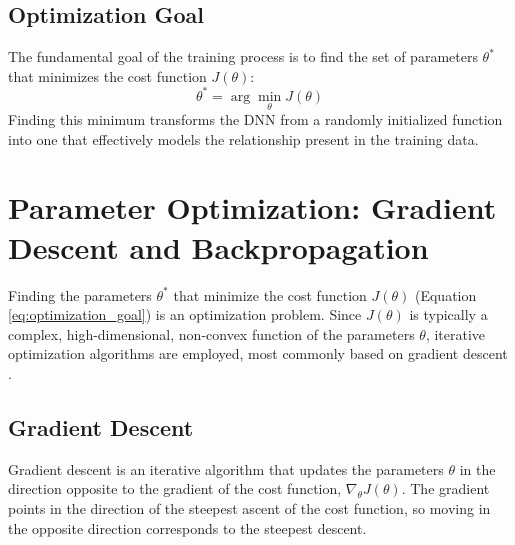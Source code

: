 \documentclass[11pt,twoside,openright]{report}
\begin{document}
\subsection{Optimization Goal}
The fundamental goal of the training process is to find the set of parameters $\theta^*$ that minimizes the cost function $J(\theta)$:
\begin{equation} \label{eq:optimization_goal}
    \theta^* = \arg \min_{\theta} J(\theta)
\end{equation}
Finding this minimum transforms the DNN from a randomly initialized function into one that effectively models the relationship present in the training data.


\newpage

\section{Parameter Optimization: Gradient Descent and Backpropagation}

Finding the parameters $\theta^*$ that minimize the cost function $J(\theta)$ (Equation \ref{eq:optimization_goal}) is an optimization problem. Since $J(\theta)$ is typically a complex, high-dimensional, non-convex function of the parameters $\theta$, iterative optimization algorithms are employed, most commonly based on gradient descent \cite{goodfellow2016deep}.

\subsection{Gradient Descent}
Gradient descent is an iterative algorithm that updates the parameters $\theta$ in the direction opposite to the gradient of the cost function, $\nabla_\theta J(\theta)$. The gradient points in the direction of the steepest ascent of the cost function, so moving in the opposite direction corresponds to the steepest descent.
\end{document}
